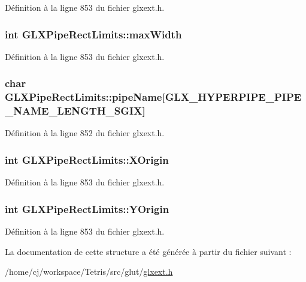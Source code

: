 Définition à la ligne 853 du fichier glxext.\-h.

\hypertarget{struct_g_l_x_pipe_rect_limits_a8662c7a712b30620e25fc994adf337a1}{
\subsubsection[{max\-Width}]{\setlength{\rightskip}{0pt plus 5cm}int G\-L\-X\-Pipe\-Rect\-Limits\-::max\-Width}}\label{struct_g_l_x_pipe_rect_limits_a8662c7a712b30620e25fc994adf337a1}


Définition à la ligne 853 du fichier glxext.\-h.

\hypertarget{struct_g_l_x_pipe_rect_limits_ae78b4b6656101bc841946733a5b6e5ce}{
\subsubsection[{pipe\-Name}]{\setlength{\rightskip}{0pt plus 5cm}char G\-L\-X\-Pipe\-Rect\-Limits\-::pipe\-Name\mbox{[}{\bf G\-L\-X\-\_\-\-H\-Y\-P\-E\-R\-P\-I\-P\-E\-\_\-\-P\-I\-P\-E\-\_\-\-N\-A\-M\-E\-\_\-\-L\-E\-N\-G\-T\-H\-\_\-\-S\-G\-I\-X}\mbox{]}}}\label{struct_g_l_x_pipe_rect_limits_ae78b4b6656101bc841946733a5b6e5ce}


Définition à la ligne 852 du fichier glxext.\-h.

\hypertarget{struct_g_l_x_pipe_rect_limits_a3e5a965059d9f5d2ca42acd35af5bb9b}{
\subsubsection[{X\-Origin}]{\setlength{\rightskip}{0pt plus 5cm}int G\-L\-X\-Pipe\-Rect\-Limits\-::\-X\-Origin}}\label{struct_g_l_x_pipe_rect_limits_a3e5a965059d9f5d2ca42acd35af5bb9b}


Définition à la ligne 853 du fichier glxext.\-h.

\hypertarget{struct_g_l_x_pipe_rect_limits_a50e06bcf0dae95854be7d93a515199e9}{
\subsubsection[{Y\-Origin}]{\setlength{\rightskip}{0pt plus 5cm}int G\-L\-X\-Pipe\-Rect\-Limits\-::\-Y\-Origin}}\label{struct_g_l_x_pipe_rect_limits_a50e06bcf0dae95854be7d93a515199e9}


Définition à la ligne 853 du fichier glxext.\-h.



La documentation de cette structure a été générée à partir du fichier suivant \-:\begin{DoxyCompactItemize}
\item 
/home/cj/workspace/\-Tetris/src/glut/\hyperlink{glxext_8h}{glxext.\-h}\end{DoxyCompactItemize}
